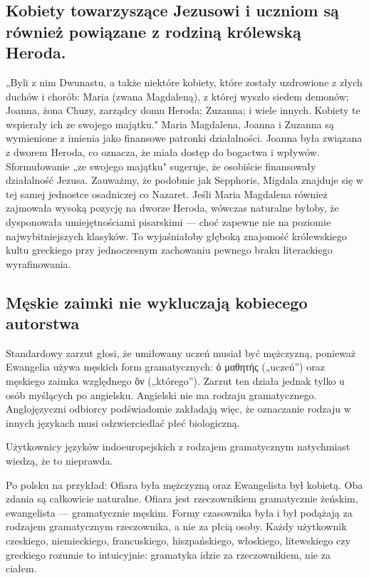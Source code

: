 \subsection{Kobiety towarzyszące Jezusowi i uczniom są również powiązane z rodziną królewską Heroda.}\label{subsec:note-the-women-traveling-with-jesus-and-the-disciples-are-also-linked-to-the-royal-family-of-herod.}

„Byli z nim Dwunastu, a także niektóre kobiety, które zostały uzdrowione z złych duchów i chorób: Maria (zwana Magdaleną), z której wyszło siedem demonów; Joanna, żona Chuzy, zarządcy domu Heroda; Zuzanna; i wiele innych.
Kobiety te wspierały ich ze swojego majątku." Maria Magdalena, Joanna i Zuzanna są wymienione z imienia jako finansowe patronki działalności.
Joanna była związana z dworem Heroda, co oznacza, że miała dostęp do bogactwa i wpływów.
Sformułowanie „ze swojego majątku" sugeruje, że osobiście finansowały działalność Jezusa.
Zauważmy, że podobnie jak Sepphoris, Migdala znajduje się w tej samej jednostce osadniczej co Nazaret.
Jeśli Maria Magdalena również zajmowała wysoką pozycję na dworze Heroda, wówczas naturalne byłoby, że dysponowała umiejętnościami pisarskimi — choć zapewne nie na poziomie najwybitniejszych klasyków.
To wyjaśniałoby głęboką znajomość królewskiego kultu greckiego przy jednoczesnym zachowaniu pewnego braku literackiego wyrafinowania.

\subsection{Męskie zaimki nie wykluczają kobiecego autorstwa}\label{subsec:the-authorship-of-mary-is-typically-dismissed-as-a-possibility-because-of-the-use-of-male-pronouns-in-the-gospel.}

Standardowy zarzut głosi, że umiłowany uczeń musiał być mężczyzną, ponieważ Ewangelia używa męskich form gramatycznych: ὁ μαθητής („uczeń”) oraz męskiego zaimka względnego ὃν („którego”).
Zarzut ten działa jednak tylko u osób myślących po angielsku.
Angielski nie ma rodzaju gramatycznego.
Anglojęzyczni odbiorcy podświadomie zakładają więc, że oznaczanie rodzaju w innych językach musi odzwierciedlać płeć biologiczną.

Użytkownicy języków indoeuropejskich z rodzajem gramatycznym natychmiast wiedzą, że to nieprawda.

Po polsku na przykład: Ofiara była mężczyzną oraz Ewangelista był kobietą.
Oba zdania są całkowicie naturalne.
Ofiara jest rzeczownikiem gramatycznie żeńskim, ewangelista — gramatycznie męskim.
Formy czasownika była i był podążają za rodzajem gramatycznym rzeczownika, a nie za płcią osoby.
Każdy użytkownik czeskiego, niemieckiego, francuskiego, hiszpańskiego, włoskiego, litewskiego czy greckiego rozumie to intuicyjnie:
gramatyka idzie za rzeczownikiem, nie za ciałem.

